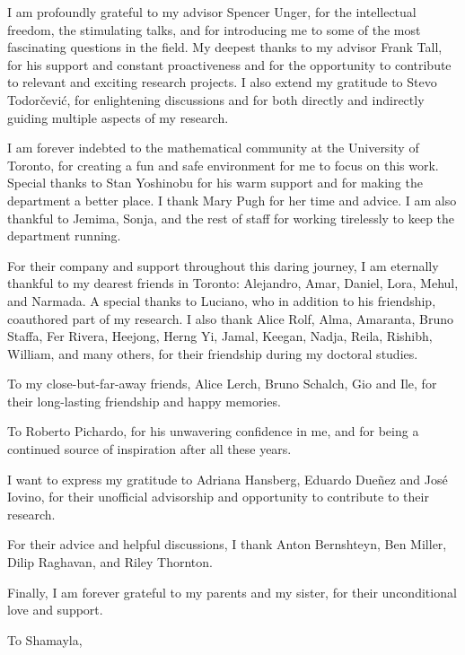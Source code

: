 
\begin{acknowledgements}
    I am profoundly grateful to my advisor Spencer Unger, for the intellectual freedom, the stimulating talks, and for introducing me to some of the most fascinating questions in the field.
    My deepest thanks to my advisor Frank Tall, for his support and constant proactiveness and for the opportunity to contribute to relevant and exciting research projects.
    I also extend my gratitude to Stevo Todor{\v{c}}evi{\'c}, for enlightening discussions and for both directly and indirectly guiding multiple aspects of my research.

    I am forever indebted to the mathematical community at the University of Toronto, for creating a fun and safe environment for me to focus on this work.
    Special thanks to Stan Yoshinobu for his warm support and for making the department a better place.
    I thank Mary Pugh for her time and advice.
    I am also thankful to Jemima, Sonja, and the rest of staff for working tirelessly to keep the department running.

    For their company and support throughout this daring journey, I am eternally thankful to my dearest friends in Toronto: Alejandro, Amar, Daniel, Lora, Mehul, and Narmada.
    A special thanks to Luciano, who in addition to his friendship, coauthored part of my research.
    I also thank Alice Rolf, Alma, Amaranta, Bruno Staffa, Fer Rivera, Heejong, Herng Yi, Jamal, Keegan, Nadja, Reila, Rishibh, William, and many others, for their friendship during my doctoral studies.

    To my close-but-far-away friends, Alice Lerch, Bruno Schalch, Gio and Ile, for their long-lasting friendship and happy memories.

    To Roberto Pichardo, for his unwavering confidence in me, and for being a continued source of inspiration after all these years.

    I want to express my gratitude to Adriana Hansberg, Eduardo Due{\~n}ez and Jos{\'e} Iovino, for their unofficial advisorship and opportunity to contribute to their research.

    For their advice and helpful discussions, I thank Anton Bernshteyn, Ben Miller, Dilip Raghavan, and Riley Thornton.

    Finally, I am forever grateful to my parents and my sister, for their unconditional love and support.

    To Shamayla, 
\end{acknowledgements}